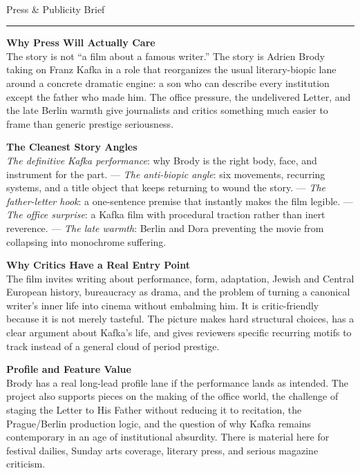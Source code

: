 \documentclass[11pt,letterpaper]{article}
\begin{document}
\begin{center}
{\Large\bfseries\sffamily \filmtitleupper}\\[3pt]
{\normalsize\sffamily\color{kafkagray} Press \& Publicity Brief}
\end{center}
\vspace{2pt}
\textcolor{sectionrule}{\rule{\textwidth}{0.5pt}}
\vspace{4pt}

\textbf{Why Press Will Actually Care}\\
The story is not ``a film about a famous writer.'' The story is Adrien Brody taking on Franz Kafka in a role that reorganizes the usual literary-biopic lane around a concrete dramatic engine: a son who can describe every institution except the father who made him. The office pressure, the undelivered Letter, and the late Berlin warmth give journalists and critics something much easier to frame than generic prestige seriousness.

\vspace{2pt}

\textbf{The Cleanest Story Angles}\\
\textit{The definitive Kafka performance}: why Brody is the right body, face, and instrument for the part. --- \textit{The anti-biopic angle}: six movements, recurring systems, and a title object that keeps returning to wound the story. --- \textit{The father-letter hook}: a one-sentence premise that instantly makes the film legible. --- \textit{The office surprise}: a Kafka film with procedural traction rather than inert reverence. --- \textit{The late warmth}: Berlin and Dora preventing the movie from collapsing into monochrome suffering.

\vspace{2pt}

\textbf{Why Critics Have a Real Entry Point}\\
The film invites writing about performance, form, adaptation, Jewish and Central European history, bureaucracy as drama, and the problem of turning a canonical writer's inner life into cinema without embalming him. It is critic-friendly because it is not merely tasteful. The picture makes hard structural choices, has a clear argument about Kafka's life, and gives reviewers specific recurring motifs to track instead of a general cloud of period prestige.

\vspace{2pt}

\textbf{Profile and Feature Value}\\
Brody has a real long-lead profile lane if the performance lands as intended. The project also supports pieces on the making of the office world, the challenge of staging the Letter to His Father without reducing it to recitation, the Prague/Berlin production logic, and the question of why Kafka remains contemporary in an age of institutional absurdity. There is material here for festival dailies, Sunday arts coverage, literary press, and serious magazine criticism.
\end{document}
